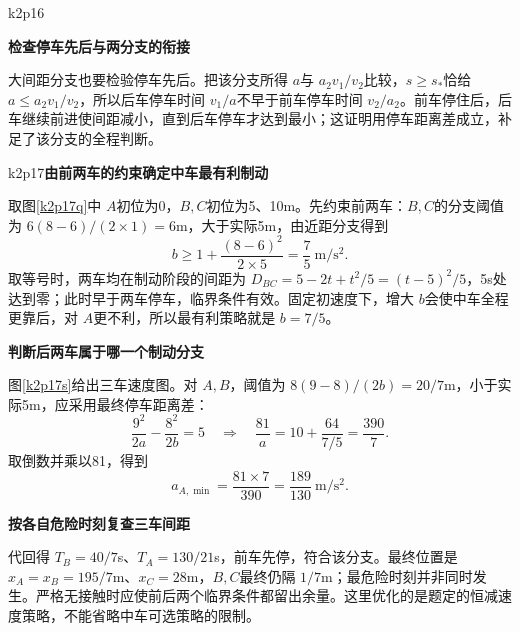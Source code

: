 \begin{drillsolution}{k2p16}
\par\medskip{}\noindent\textbf{检查停车先后与两分支的衔接}\par\nobreak
大间距分支也要检验停车先后。把该分支所得 $a$与 $a_2v_1/v_2$比较，$s\ge s_*$恰给 $a\le a_2v_1/v_2$，所以后车停车时间 $v_1/a$不早于前车停车时间 $v_2/a_2$。前车停住后，后车继续前进使间距减小，直到后车停车才达到最小；这证明用停车距离差成立，补足了该分支的全程判断。\end{drillsolution}

\begin{drillsolution}{k2p17}\textbf{由前两车的约束确定中车最有利制动}\par\nobreak
取图\ref{k2p17q}中 $A$初位为0，$B,C$初位为5、10m。先约束前两车：$B,C$的分支阈值为 $6(8-6)/(2\times1)=6$m，大于实际5m，由近距分支得到
\[b\ge1+\frac{(8-6)^2}{2\times5}=\frac75\ \mathrm{m/s^2}.
\]
取等号时，两车均在制动阶段的间距为 $D_{BC}=5-2t+t^2/5=(t-5)^2/5$，5s处达到零；此时早于两车停车，临界条件有效。固定初速度下，增大 $b$会使中车全程更靠后，对 $A$更不利，所以最有利策略就是 $b=7/5$。




\par\medskip{}\noindent\textbf{判断后两车属于哪一个制动分支}\par\nobreak
图\ref{k2p17s}给出三车速度图。对 $A,B$，阈值为 $8(9-8)/(2b)=20/7$m，小于实际5m，应采用最终停车距离差：
\[
 \frac{9^2}{2a}-\frac{8^2}{2b}=5
 \quad\Longrightarrow\quad
 \frac{81}{a}=10+\frac{64}{7/5}=\frac{390}{7}.
\]
取倒数并乘以81，得到
\[\boxed{a_{A,\min}=\frac{81\times7}{390}
 =\frac{189}{130}\ \mathrm{m/s^2}}.\]


\par\medskip{}\noindent\textbf{按各自危险时刻复查三车间距}\par\nobreak
代回得 $T_B=40/7$s、$T_A=130/21$s，前车先停，符合该分支。最终位置是 $x_A=x_B=195/7$m、$x_C=28$m，$B,C$最终仍隔 $1/7$m；最危险时刻并非同时发生。严格无接触时应使前后两个临界条件都留出余量。这里优化的是题定的恒减速度策略，不能省略中车可选策略的限制。

\end{drillsolution}

